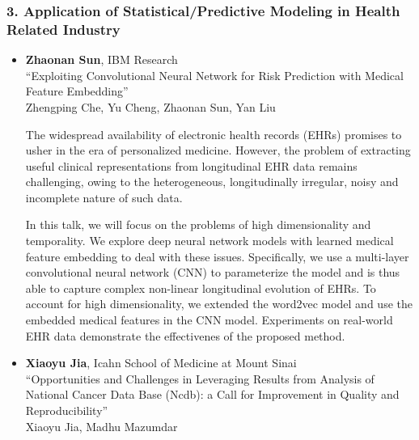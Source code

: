 \subsubsection*{3. Application of Statistical/Predictive Modeling in Health Related Industry}

\begin{itemize}
\item \textbf{Zhaonan Sun}, IBM Research \\
``Exploiting Convolutional Neural Network for Risk Prediction with Medical Feature Embedding'' \\
Zhengping Che, Yu Cheng, Zhaonan Sun, Yan Liu


The widespread availability of electronic health records (EHRs) promises to usher in the era of personalized medicine. However, the problem of extracting useful clinical representations from longitudinal EHR data remains challenging, owing to the heterogeneous, longitudinally irregular, noisy and incomplete nature of such data.

In this talk, we will focus on the problems of high dimensionality and temporality. We explore deep neural network models with learned medical feature embedding to deal with these issues. Specifically, we use a multi-layer convolutional neural network (CNN) to parameterize the model and is thus able to capture complex non-linear longitudinal evolution of EHRs. To account for high dimensionality, we extended the word2vec model and use the embedded medical features in the CNN model. Experiments on real-world EHR data demonstrate the effectivenes of the proposed method. 

\item \textbf{Xiaoyu Jia}, Icahn School of Medicine at Mount Sinai \\
``Opportunities and Challenges in Leveraging Results from Analysis of National Cancer Data Base (Ncdb): a Call for Improvement in Quality and Reproducibility'' \\
Xiaoyu Jia, Madhu Mazumdar



\end{itemize}
